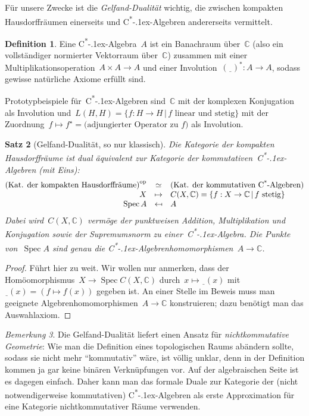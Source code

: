 \documentclass[a4paper,ngerman,12pt]{scrartcl}
\theoremstyle{definition}
\newtheorem{defn}{Definition}[section]
\theoremstyle{plain}
\newtheorem{satz}[defn]{Satz}
\theoremstyle{remark}
\newtheorem{bem}[defn]{Bemerkung}
\newcommand{\CC}{\mathbb{C}}
\newcommand{\freist}{\underline{\ \ }}
\newcommand{\csalgebra}{C\textsuperscript{*}\kern-.1ex-Algebra}
\newcommand{\csalgebren}{C\textsuperscript{*}\kern-.1ex-Alge\-bren}
\DeclareMathOperator{\Spec}{Spec}
\newcommand{\op}{\mathrm{op}}
\renewcommand{\_}{\mathpunct{.}\,}
\newcommand{\?}{\,{:}\,}
\begin{document}
Für unsere Zwecke ist die \emph{Gelfand-Dualität} wichtig, die zwischen
kompakten Hausdorffräumen einerseits und \csalgebren{} andererseits vermittelt.
\begin{defn}Eine \csalgebra~$A$ ist ein Banachraum über~$\CC$ (also ein vollständiger
normierter Vektorraum über~$\CC$) zusammen mit einer
Multiplikationsoperation~$A \times A \to A$ und einer Involution~$(\freist)^* :
A \to A$, sodass gewisse natürliche Axiome erfüllt sind.\end{defn}
Prototypbeispiele für~\csalgebren{} sind~$\CC$ mit der komplexen Konjugation
als Involution und~$L(H,H) = \{ f : H \to H \,|\, \text{$f$ linear und stetig}
\}$ mit der Zuordnung~$f \mapsto f^\star = \text{(adjungierter Operator
zu~$f$)}$ als Involution.
\begin{satz}[Gelfand-Dualität, so nur klassisch]
Die Kategorie der kompakten Hausdorffräume ist dual äquivalent zur Kategorie
der kommutativen~\csalgebren{} (mit Eins):
\[ \begin{array}{@{}rcl@{}}
  \textnormal{(Kat. der kompakten Hausdorffräume)}^\op &\simeq&
  \textnormal{(Kat. der kommutativen \csalgebren)} \\
  X &\mapsto& C(X, \CC) = \{ f : X \to \CC \,|\, \textnormal{$f$ stetig} \} \\
  \Spec A &\mapsfrom& A
\end{array} \]
Dabei wird~$C(X, \CC)$ vermöge der punktweisen Addition, Multiplikation und
Konjugation sowie der Supremumsnorm zu einer~\csalgebra. Die Punkte von~$\Spec
A$ sind genau die \csalgebren{}homomorphismen~$A \to \CC$.
\end{satz}
\begin{proof}
Führt hier zu weit. Wir wollen nur anmerken, dass der Homöomorphismus~$X \to
\Spec C(X,\CC)$ durch~$x \longmapsto \freist(x)$ mit~$\freist(x) = (f \mapsto
f(x))$ gegeben ist. An einer Stelle im Beweis muss man geeignete
Algebrenhomomorphismen~$A \to \CC$ konstruieren; dazu benötigt man das
Auswahlaxiom.
\end{proof}

\begin{bem}Die Gelfand-Dualität liefert einen Ansatz für \emph{nichtkommutative
Geometrie}: Wie man die Definition eines topologischen Raums abändern sollte,
sodass sie nicht mehr "`kommutativ"' wäre, ist völlig unklar, denn in
der Definition kommen ja gar keine binären Verknüpfungen vor. Auf der algebraischen Seite
ist es dagegen einfach. Daher kann man das formale Duale zur Kategorie der
(nicht notwendigerweise kommutativen) \csalgebren{} als erste Approximation für
eine Kategorie nichtkommutativer Räume verwenden.
\end{bem}
\end{document}
